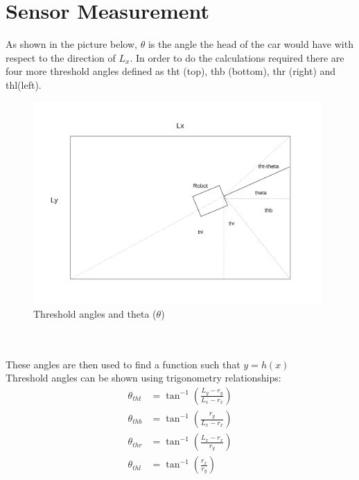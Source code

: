 \documentclass[12pt, letterpaper]{amsart} %
\numberwithin{equation}{section}
\begin{document}
\section{Sensor Measurement}
As shown in the picture below, $\theta$ is the angle the head of the car would have with respect to the direction of $L_x$. In order to do the calculations required there are four more threshold angles defined as tht (top), thb (bottom), thr (right) and thl(left). 
\begin{figure}[h!]
\includegraphics[width=110mm]{fig_2.png}
\caption{Threshold angles and theta ($\theta$)}
\label{fig:figure2}
\end{figure}
\\
\\
These angles are then used to find a function such that $y = h(x)$ \\
Threshold angles can be shown using trigonometry relationships:
\begin{align*}
  \theta_{tht} &= \tan^{-1}(\frac{L_y - r_y}{L_x - r_x}) \\
  \theta_{thb} &= \tan^{-1}(\frac{r_y}{L_x - r_x}) \\
  \theta_{thr} &= \tan^{-1}(\frac{L_x-r_x}{r_y}) \\
  \theta_{thl} &= \tan^{-1}(\frac{r_x}{r_y})
\end{align*}
\end{document}
